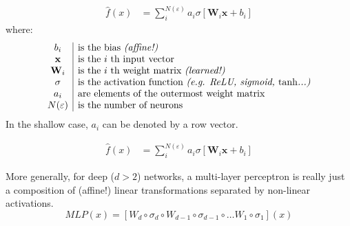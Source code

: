 \begin{frame}
    \begin{align*}
        \hat{f}(x) &=  \sum_i^{N(\varepsilon)} a_i \sigma \left[\mathbf{W}_i \mathbf{x} + b_i \right]
    \end{align*}
    where:
    \[
        \begin{array}{c|l}
            b_i & \text{is the bias \textit{(affine!)}} \\
            \mathbf{x} & \text{is the $i$ th input vector} \\
            \mathbf{W}_i & \text{is the $i$ th weight matrix \textit{(learned!)}} \\
            \sigma & \text{is the activation function \textit{(e.g. ReLU, sigmoid, $\tanh$...)}} \\
            a_i & \text{are elements of the outermost weight matrix} \\
            N(\varepsilon) & \text{is the number of neurons}
        \end{array}
    \]
    In the shallow case, $a_i$ can be denoted by a row vector.
\end{frame}
\begin{frame}
    \begin{align*}
        \hat{f}(x) &=  \sum_i^{N(\varepsilon)} a_i \sigma \left[\mathbf{W}_i \mathbf{x} + b_i \right]
    \end{align*}
\end{frame}
\begin{frame}
    More generally, for deep ($d > 2$) networks, a multi-layer perceptron is
    really just a composition of (affine!) linear transformations separated by non-linear
    activations.
    \[
        MLP(x) = \left[
            W_d \circ \sigma_d \circ
            W_{d-1} \circ \sigma_{d-1} \circ
                \ldots
            W_{1} \circ \sigma_{1} 
        \right] (x)
    \]
\end{frame}

